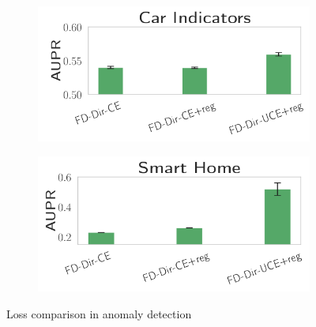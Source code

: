 \begin{figure}[H]
\centering
    \begin{subfigure}{0.3\textwidth}
        \centering
        \includegraphics[width=\linewidth]{images/uncertainty-apr-bmw-indicator-ok3.png}
    \end{subfigure}%
    \begin{subfigure}{0.3\textwidth}
        \centering
        \includegraphics[width=\linewidth]{images/uncertainty-apr-kast-home-ok3.png}
    \end{subfigure}%
    \caption{Loss comparison in anomaly detection}
    \label{fig:loss_comparison}
    \vspace{-0.5cm}
\end{figure}

